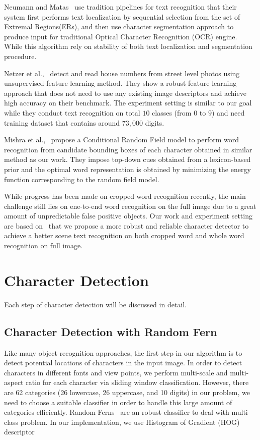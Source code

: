 \documentclass[10pt,twocolumn,letterpaper]{article}
\begin{document}
Neumann and Matas~\cite{120,119} use tradition pipelines for text recognition that their system first performs text localization by sequential selection from the set of Extremal Regions(ERs), and then use character segmentation approach to produce input for traditional Optical Character Recognition (OCR) engine. While this algorithm rely on stability of both text localization and segmentation procedure.

Netzer et al.,~\cite{121} detect and read house numbers from street level photos using unsupervised feature learning method. They show a robust feature learning approach that does not need to use any existing image descriptors and achieve high accuracy on their benchmark. The experiment setting is similar to our goal while they conduct text recognition on total $10$ classes (from $0$ to $9$) and need training dataset that contains around $73,000$ digits.

Mishra et al.,~\cite{111} propose a Conditional Random Field model to perform word recognition from candidate bounding boxes of each character obtained in similar method as our work. They impose top-down cues obtained from a lexicon-based prior and the optimal word representation is obtained by minimizing the energy function corresponding to the random field model.

While progress has been made on cropped word recognition recently, the main challenge still lies on ene-to-end word recognition on the full image due to a great amount of unpredictable false positive objects. Our work and experiment setting are based on~\cite{417} that we propose a more robust and reliable character detector to achieve a better scene text recognition on both cropped word and whole word recognition on full image.

\section{Character Detection}

Each step of character detection will be discussed in detail.

\subsection{Character Detection with Random Fern}

Like many object recognition approaches, the first step in our algorithm is to detect potential locations of characters in the input image. In order to detect characters in different fonts and view points, we perform multi-scale and multi-aspect ratio for each character via sliding window classification. However, there are 62 categories (26 lowercase, 26 uppercase, and 10 digits) in our problem, we need to choose a suitable classifier in order to handle this large amount of categories efficiently. Random Ferns~\cite{113,112,114} are an robust classifier to deal with multi-class problem. In our implementation, we use Histogram of Gradient (HOG) descriptor~\cite{115}
\end{document}
